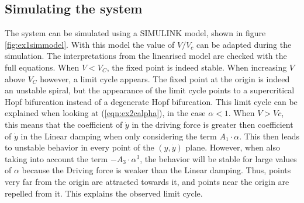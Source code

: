 \subsection{Simulating the system}
The system can be simulated using a SIMULINK model, shown in figure \ref{fig:ex1simmodel}. With this model the value of $V/V_c$ can be adapted during the simulation. The interpretations from the linearised model are checked with the full equations. When $V<V_C$, the fixed point is indeed stable. When increasing $V$ above $V_C$ however, a limit cycle appears. The fixed point at the origin is indeed an unstable spiral, but the appearance of the limit cycle points to a supercritical Hopf bifurcation instead of a degenerate Hopf bifurcation. This limit cycle can be explained when looking at (\ref{eqn:ex2calpha}), in the case $\alpha<1$. When $V>Vc$, this means that the coefficient of $\dot{y}$ in the driving force is greater then coefficient of $\dot{y}$ in the Linear damping when only considering the term $A_1\cdot \alpha$. This then leads to unstable behavior in every point of the $(y,\dot{y})$ plane. However, when also taking into account the term $-A_3\cdot \alpha^3$, the behavior will be stable for large values of $\alpha$ because the Driving force is weaker than the Linear damping. Thus, points very far from the origin are attracted towards it, and points near the origin are repelled from it. This explains the observed limit cycle.
